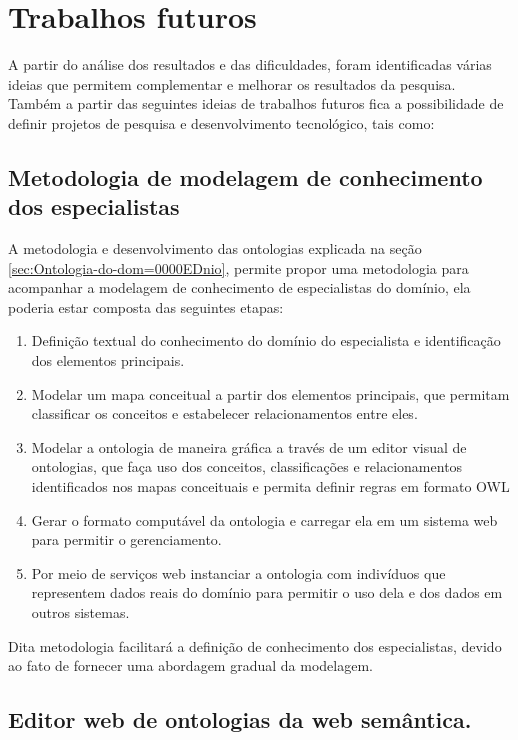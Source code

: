 \section{Trabalhos futuros}

A partir do análise dos resultados e das dificuldades, foram identificadas
várias ideias que permitem complementar e melhorar os resultados da
pesquisa. Também a partir das seguintes ideias de trabalhos futuros
fica a possibilidade de definir projetos de pesquisa e desenvolvimento
tecnológico, tais como:

\subsection*{Metodologia de modelagem de conhecimento dos especialistas}

A metodologia e desenvolvimento das ontologias explicada na seção
\ref{sec:Ontologia-do-dom=0000EDnio}, permite propor uma metodologia
para acompanhar a modelagem de conhecimento de especialistas do domínio,
ela poderia estar composta das seguintes etapas:
\begin{enumerate}
\item Definição textual do conhecimento do domínio do especialista e identificação
dos elementos principais.
\item Modelar um mapa conceitual a partir dos elementos principais, que
permitam classificar os conceitos e estabelecer relacionamentos entre
eles.
\item Modelar a ontologia de maneira gráfica a través de um editor visual
de ontologias, que faça uso dos conceitos, classificações e relacionamentos
identificados nos mapas conceituais e permita definir regras em formato
\foreignlanguage{english}{OWL}
\item Gerar o formato computável da ontologia e carregar ela em um sistema
web para permitir o gerenciamento.
\item Por meio de serviços \foreignlanguage{english}{web} instanciar a ontologia
com indivíduos que representem dados reais do domínio para permitir
o uso dela e dos dados em outros sistemas.
\end{enumerate}
Dita metodologia facilitará a definição de conhecimento dos especialistas,
devido ao fato de fornecer uma abordagem gradual da modelagem.

\subsection*{Editor web de ontologias da web semântica.}

